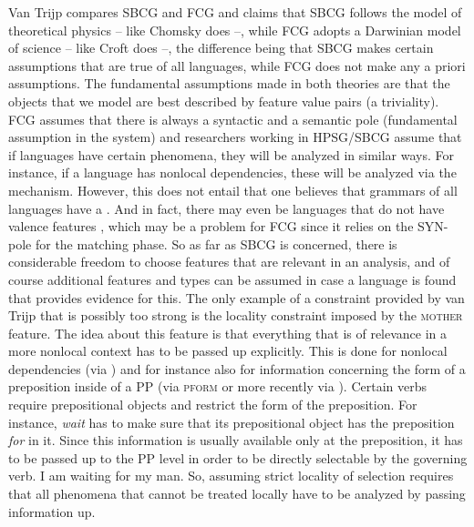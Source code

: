 
\largerpage[2]
Van Trijp compares SBCG and FCG and claims that SBCG follows the model of theoretical physics --
like Chomsky does --, while FCG adopts a Darwinian model of science -- like Croft does --, the difference
being that SBCG makes certain assumptions that are true of all languages, while FCG does not make
any a priori assumptions. The fundamental assumptions made in both theories are that the
objects that we model are best described by feature value pairs (a triviality). FCG assumes that
there is always a syntactic and a semantic pole (fundamental assumption in the system) and
researchers working in HPSG/SBCG assume that if languages have certain phenomena, they will be
analyzed in similar ways. For instance, if a language has nonlocal dependencies, these will be
analyzed via the \slasch mechanism. However, this does not entail that one believes that grammars of
all languages have a \slashf. And in fact, there may even be languages that do not have valence
features \citep{KM2010a-u}, which may be a problem for FCG since it relies on the SYN-pole for the
matching phase. So as far as SBCG is concerned, there is considerable freedom to choose features
that are relevant in an analysis, and of course additional features and types can be assumed in case
a language is found that provides evidence for this. The only example of a constraint provided by van Trijp that is possibly too strong
 is the locality constraint imposed by the \textsc{mother}
feature. The idea about this feature is that everything that is of relevance in a more nonlocal
context has to be passed up explicitly. This is done for nonlocal dependencies (via \slasch) and for instance also
for information concerning the form of a preposition inside of a PP (via \textsc{pform} or more
recently via \form). Certain verbs require prepositional objects and restrict
the form of the preposition. For instance, \emph{wait} has to make sure that its prepositional
object has the preposition \emph{for} in it. Since this information is usually available only at the
preposition, it has to be passed up to the PP level in order to be directly selectable by the
governing verb. 
\ea
I am waiting for my man.
\z 
So, assuming strict locality of selection requires that all phenomena that cannot be treated locally
have to be analyzed by passing information up.
